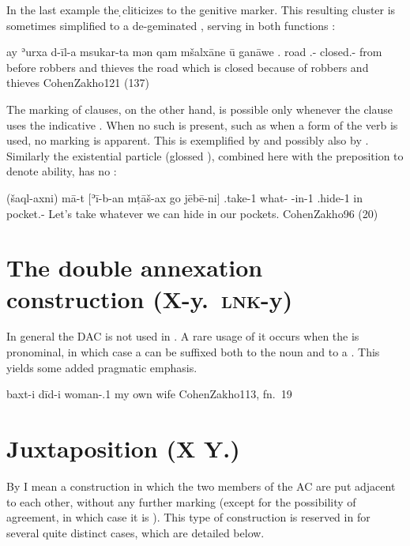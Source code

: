 In the last example the \d \lnk* cliticizes to the \d genitive marker. This resulting  cluster is sometimes simplified to a de-geminated , serving in both functions \citep[cf.][122]{CohenZakho}:

{ay ʾurxa d-īl-a msukar-ta mən qam mšalxāne ū\cb{} ganāwe}
{.\fem{} road \lnk.\gen-\fem{} closed.\resl-\fem{} from before robbers and\cb{} thieves}
{the road which is closed because of robbers and thieves}
{CohenZakho}{121 (137)}



The \gen* marking of clauses, on the other hand, is possible only whenever the \secn clause uses the indicative . When no such  is present, such as when a form of the verb  is used, no \gen* marking is apparent. This is exemplified by  and possibly also by . Similarly the existential particle (glossed \exist), combined here with the preposition  to denote ability,  has no :

{(šaql-axni) mā-t [ʾī-b-an mṭāš-ax go jēbē-ni]}
{\sbjv.take-1\pl{} what-\cst{} \exist-in-1\pl{} \sbjv.hide-1\pl{} in pocket.\pl-\pl}
{Let’s take whatever we can hide in our pockets.}
{CohenZakho}{96 (20)}



\section{The double annexation construction (X-y.\poss\ \textsc{lnk}-y)} \label{ss:JZax_DAC}

In general the DAC is not used in \JZax. A rare usage of it occurs when the \secn is pronominal, in which case a  can be suffixed both to the \prim noun and to a \lnk*. This yields some added pragmatic emphasis. 

{baxt-i dīd-i}
{woman-\poss.1\sg{} \sg}
{my own wife}
{CohenZakho}{113, fn.\ 19}


\section{Juxtaposition (X Y.\opt{\agr})} \label{ss:JZax_juxt}

By  I mean a construction in which the two members of the AC are put adjacent to each other, without any further marking (except for the possibility of agreement, in which case it is ).
This type of construction is reserved in \JZax for several quite distinct cases, which are detailed below.

